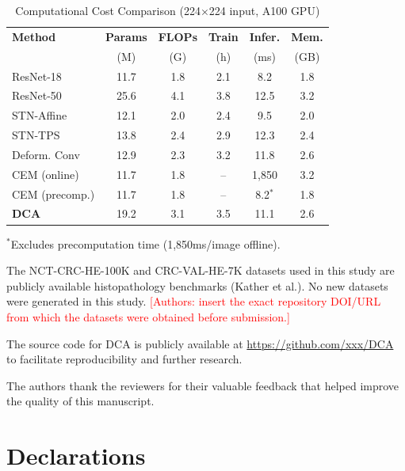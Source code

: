 \documentclass[pdflatex,sn-nature]{sn-jnl}%
\theoremstyle{thmstyleone}%
\theoremstyle{thmstyletwo}%
\theoremstyle{thmstylethree}%
\begin{document}
\begin{table}[t]
\centering
\caption{Computational Cost Comparison (224$\times$224 input, A100 GPU)}
\label{tab:computational}
\begin{tabularx}{\textwidth}{Xccccc}
\hline
\textbf{Method} & \textbf{Params} & \textbf{FLOPs} & \textbf{Train} & \textbf{Infer.} & \textbf{Mem.} \\
 & (M) & (G) & (h) & (ms) & (GB) \\
\hline
ResNet-18 & 11.7 & 1.8 & 2.1 & 8.2 & 1.8 \\
ResNet-50 & 25.6 & 4.1 & 3.8 & 12.5 & 3.2 \\
STN-Affine & 12.1 & 2.0 & 2.4 & 9.5 & 2.0 \\
STN-TPS & 13.8 & 2.4 & 2.9 & 12.3 & 2.4 \\
Deform. Conv & 12.9 & 2.3 & 3.2 & 11.8 & 2.6 \\
CEM (online) & 11.7 & 1.8 & -- & 1,850 & 3.2 \\
CEM (precomp.) & 11.7 & 1.8 & -- & 8.2$^*$ & 1.8 \\
\textbf{DCA} & 19.2 & 3.1 & 3.5 & 11.1 & 2.6 \\
\hline
\end{tabularx}

\vspace{1mm}
\footnotesize{$^*$Excludes precomputation time (1,850ms/image offline).}
\end{table}
\backmatter

The NCT-CRC-HE-100K and CRC-VAL-HE-7K datasets used in this study are publicly available histopathology benchmarks (Kather et al.). No new datasets were generated in this study. \textcolor{red}{[Authors: insert the exact repository DOI/URL from which the datasets were obtained before submission.]}

The source code for DCA is publicly available at \url{https://github.com/xxx/DCA} to facilitate reproducibility and further research.

The authors thank the reviewers for their valuable feedback that helped improve the quality of this manuscript.

\section*{Declarations}
\end{document}
